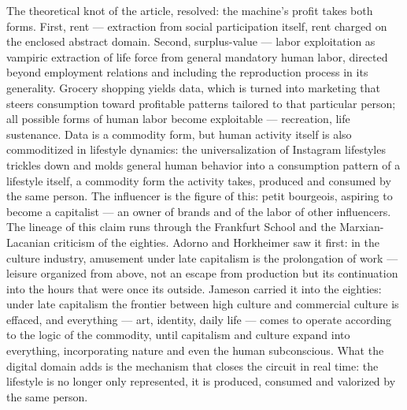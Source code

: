 \documentclass[11pt]{article}
\begin{document}

The theoretical knot of the article, resolved: the machine's profit
takes both forms. First, rent --- extraction from social participation
itself, rent charged on the enclosed abstract domain. Second,
surplus-value --- labor exploitation as vampiric extraction of life
force from general mandatory human labor, directed beyond employment
relations and including the reproduction process in its generality.
Grocery shopping yields data, which is turned into marketing that steers
consumption toward profitable patterns tailored to that particular
person; all possible forms of human labor become exploitable ---
recreation, life sustenance. Data is a commodity form, but human
activity itself is also commoditized in lifestyle dynamics: the
universalization of Instagram lifestyles trickles down and molds general
human behavior into a consumption pattern of a lifestyle itself, a
commodity form the activity takes, produced and consumed by the same
person. The influencer is the figure of this: petit bourgeois, aspiring
to become a capitalist --- an owner of brands and of the labor of other
influencers. The lineage of this claim runs through the Frankfurt School
and the Marxian-Lacanian criticism of the eighties. Adorno and Horkheimer
saw it first: in the culture industry, amusement under late capitalism is
the prolongation of work --- leisure organized from above, not an escape
from production but its continuation into the hours that were once its
outside. Jameson carried it into the eighties: under late capitalism the
frontier between high culture and commercial culture is effaced, and
everything --- art, identity, daily life --- comes to operate according
to the logic of the commodity, until capitalism and culture expand into
everything, incorporating nature and even the human subconscious. What
the digital domain adds is the mechanism that closes the circuit in real
time: the lifestyle is no longer only represented, it is produced,
consumed and valorized by the same person.
\end{document}
